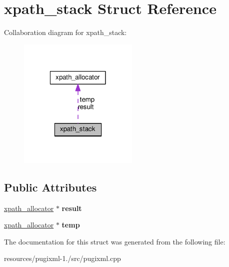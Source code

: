 \hypertarget{structxpath__stack}{\section{xpath\+\_\+stack Struct Reference}
\label{structxpath__stack}
}


Collaboration diagram for xpath\+\_\+stack\+:
\nopagebreak
\begin{figure}[H]
\begin{center}
\leavevmode
\includegraphics[width=162pt]{structxpath__stack__coll__graph}
\end{center}
\end{figure}
\subsection*{Public Attributes}
\begin{DoxyCompactItemize}
\item 
\hypertarget{structxpath__stack_adce164b779cbb3d1bc093a772067ea7e}{\hyperlink{classxpath__allocator}{xpath\+\_\+allocator} $\ast$ {\bfseries result}}\label{structxpath__stack_adce164b779cbb3d1bc093a772067ea7e}

\item 
\hypertarget{structxpath__stack_a48edd585dfb910c6c016559f07fea0d8}{\hyperlink{classxpath__allocator}{xpath\+\_\+allocator} $\ast$ {\bfseries temp}}\label{structxpath__stack_a48edd585dfb910c6c016559f07fea0d8}

\end{DoxyCompactItemize}


The documentation for this struct was generated from the following file\+:\begin{DoxyCompactItemize}
\item 
resources/pugixml-\/1./src/pugixml.\+cpp\end{DoxyCompactItemize}
